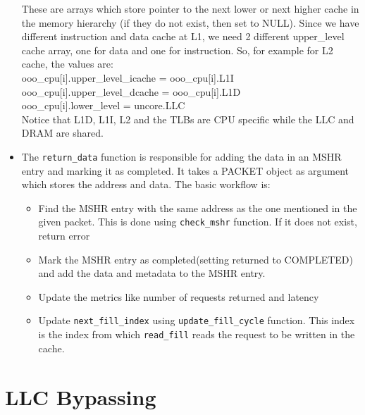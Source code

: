 \documentclass[11pt, swedish, openany]{book}
\begin{document}
\begin{itemize}
          These are arrays which store pointer to the next lower or next higher cache in the memory hierarchy (if they do not exist, then set to NULL). Since we have different instruction and data cache at L1, we need 2 different upper\_level cache array, one for data and one for instruction. So, for example for L2 cache, the values are:\\
          ooo\_cpu[i].upper\_level\_icache = ooo\_cpu[i].L1I\\
          ooo\_cpu[i].upper\_level\_dcache = ooo\_cpu[i].L1D\\
          ooo\_cpu[i].lower\_level = uncore.LLC\\
          Notice that L1D, L1I, L2 and the TLBs are CPU specific while the LLC and DRAM are shared.
    \item The \texttt{return\_data} function is responsible for adding the data in an MSHR entry and marking it as completed. It takes a PACKET object as argument which stores the address and data. The basic workflow is:
          \begin{itemize}
              \item Find the MSHR entry with the same address as the one mentioned in the given packet. This is done using \texttt{check\_mshr} function. If it does not exist, return error
              \item Mark the MSHR entry as completed(setting returned to COMPLETED) and add the data and metadata to the MSHR entry.
              \item Update the metrics like number of requests returned and latency
              \item Update \texttt{next\_fill\_index} using \texttt{update\_fill\_cycle} function. This index is the index from which \texttt{read\_fill} reads the request to be written in the cache.
          \end{itemize}
\end{itemize}



\chapter{LLC Bypassing}
\label{LLC Bypassing}
\end{document}

